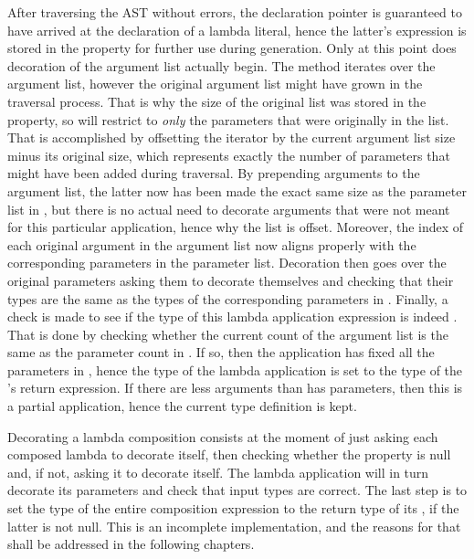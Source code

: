 After traversing the AST without errors, the declaration pointer is guaranteed to have arrived at the declaration of a lambda literal, hence the latter's expression is stored in the  property for further use during generation. Only at this point does decoration of the argument list actually begin. The  method iterates over the argument list, however the original argument list might have grown in the traversal process. That is why the size of the original list was stored in the  property, so  will restrict to \emph{only} the parameters that were originally in the list. That is accomplished by offsetting the iterator by the current argument list size minus its original size, which represents exactly the number of parameters that might have been added during traversal. By prepending arguments to the argument list, the latter now has been made the exact same size as the parameter list in , but there is no actual need to decorate arguments that were not meant for this particular application, hence why the list is offset. Moreover, the index of each original argument in the argument list now aligns properly with the corresponding parameters in the  parameter list. Decoration then goes over the original parameters asking them to decorate themselves and checking that their types are the same as the types of the corresponding parameters in . Finally, a check is made to see if the type of this lambda application expression is indeed . That is done by checking whether the current count of the argument list is the same as the parameter count in . If so, then the application has fixed all the parameters in , hence the type of the lambda application is set to the type of the 's return expression. If there are less arguments than  has parameters, then this is a partial application, hence the current type definition is kept.

Decorating a lambda composition consists at the moment of just asking each composed lambda to decorate itself, then checking whether the  property is null and, if not, asking it to decorate itself. The lambda application will in turn decorate its parameters and check that input types are correct. The last step is to set the type of the entire composition expression to the return type of its , if the latter is not null. This is an incomplete implementation, and the reasons for that shall be addressed in the following chapters.

